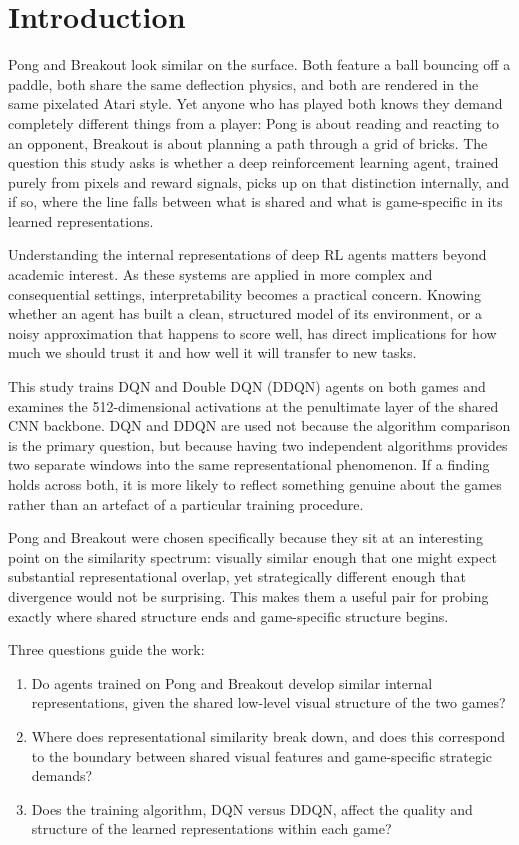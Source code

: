 \documentclass[a4paper]{article}
\begin{document}
\section{Introduction}

Pong and Breakout look similar on the surface. Both feature a ball bouncing off a paddle, both share the same deflection physics, and both are rendered in the same pixelated Atari style. Yet anyone who has played both knows they demand completely different things from a player: Pong is about reading and reacting to an opponent, Breakout is about planning a path through a grid of bricks. The question this study asks is whether a deep reinforcement learning agent, trained purely from pixels and reward signals, picks up on that distinction internally, and if so, where the line falls between what is shared and what is game-specific in its learned representations.

Understanding the internal representations of deep RL agents matters beyond academic interest. As these systems are applied in more complex and consequential settings, interpretability becomes a practical concern. Knowing whether an agent has built a clean, structured model of its environment, or a noisy approximation that happens to score well, has direct implications for how much we should trust it and how well it will transfer to new tasks.

This study trains DQN \cite{mnih2015human} and Double DQN (DDQN) \cite{van2016deep} agents on both games and examines the 512-dimensional activations at the penultimate layer of the shared CNN backbone. DQN and DDQN are used not because the algorithm comparison is the primary question, but because having two independent algorithms provides two separate windows into the same representational phenomenon. If a finding holds across both, it is more likely to reflect something genuine about the games rather than an artefact of a particular training procedure.

Pong and Breakout were chosen specifically because they sit at an interesting point on the similarity spectrum: visually similar enough that one might expect substantial representational overlap, yet strategically different enough that divergence would not be surprising. This makes them a useful pair for probing exactly where shared structure ends and game-specific structure begins.

Three questions guide the work:
\begin{enumerate}
    \item Do agents trained on Pong and Breakout develop similar internal representations, given the shared low-level visual structure of the two games?
    \item Where does representational similarity break down, and does this correspond to the boundary between shared visual features and game-specific strategic demands?
    \item Does the training algorithm, DQN versus DDQN, affect the quality and structure of the learned representations within each game?
\end{enumerate}
\end{document}
